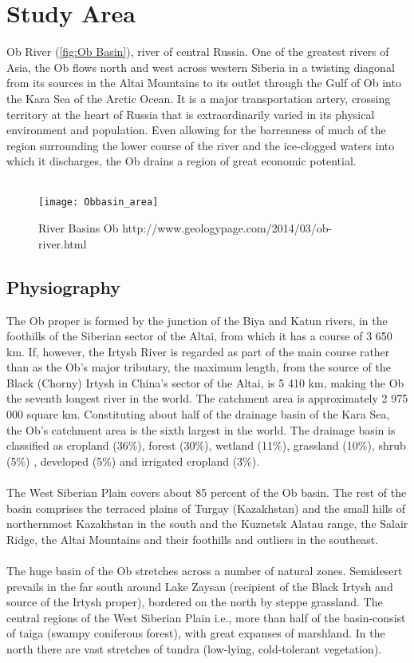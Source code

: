 \chapter{Study Area}
Ob River (\autoref{fig:Ob Basin}), river of central Russia. One of the greatest rivers of Asia, the Ob flows north and west across western Siberia in a twisting diagonal from its sources in the Altai Mountains to its outlet through the Gulf of Ob into the Kara Sea of the Arctic Ocean. It is a major transportation artery, crossing territory at the heart of Russia that is extraordinarily varied in its physical environment and population. Even allowing for the barrenness of much of the region surrounding the lower course of the river and the ice-clogged waters into which it discharges, the Ob drains a region of great economic potential.\\\\
\begin{figure}[htbp]
	\centering
	\texttt{[image: Obbasin\_area]} %
	\caption{River Basins Ob http://www.geologypage.com/2014/03/ob-river.html} 
	\label{fig:Ob Basin}
\end{figure}
\section{Physiography}
The Ob proper is formed by the junction of the Biya and Katun rivers, in the foothills of the Siberian sector of the Altai, from which it has a course of 3 650 km. If, however, the Irtysh River is regarded as part of the main course rather than as the Ob's major tributary, the maximum length, from the source of the Black (Chorny) Irtysh in China's sector of the Altai, is 5 410 km, making the Ob the seventh longest river in the world. The catchment area is approximately 2 975 000 square km. Constituting about half of the drainage basin of the Kara Sea, the Ob's catchment area is the sixth largest in the world. The drainage basin is classified as cropland (36\%), forest (30\%), wetland (11\%), grassland (10\%), shrub (5\%) , developed (5\%) and irrigated cropland (3\%).\cite{revenga1998watersheds}\\\\
The West Siberian Plain covers about 85 percent of the Ob basin.\cite{Obriver} The rest of the basin comprises the terraced plains of Turgay (Kazakhstan) and the small hills of northernmost Kazakhstan in the south and the Kuznetsk Alatau range, the Salair Ridge, the Altai Mountains and their foothills and outliers in the southeast.\\\\
The huge basin of the Ob stretches across a number of natural zones. Semidesert prevails in the far south around Lake Zaysan (recipient of the Black Irtysh and source of the Irtysh proper), bordered on the north by steppe grassland. The central regions of the West Siberian Plain i.e., more than half of the basin-consist of taiga (swampy coniferous forest), with great expanses of marshland. In the north there are vast stretches of tundra (low-lying, cold-tolerant vegetation).
